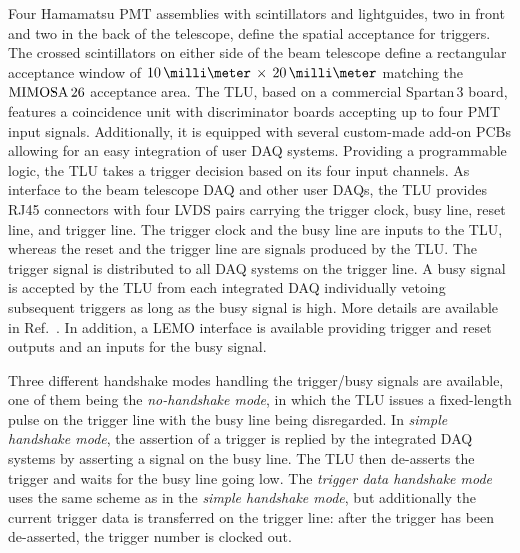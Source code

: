Four Hamamatsu PMT assemblies with scintillators and lightguides, two in front and two in the back of the telescope, define the spatial acceptance for triggers. 
The crossed scintillators on either side of the beam telescope define a rectangular acceptance window of $10\,\milli\meter\,\times\,20\,\milli\meter$ matching the $\textrm{MIMOSA\,26}$ acceptance area. 
The TLU, based on a commercial Spartan\,3 board, features a coincidence unit with discriminator boards accepting up to four PMT input signals. 
Additionally, it is equipped with several custom-made add-on PCBs allowing for an easy integration of user DAQ systems. 
Providing a programmable logic, the TLU  takes a trigger decision based on its four input channels. 
As interface to the beam telescope DAQ and other user DAQs, the TLU provides RJ45 connectors with four LVDS pairs carrying the trigger clock, busy line, reset line, and trigger line. 
The trigger clock and the busy line are inputs to the TLU, whereas the reset and the trigger line are signals produced by the TLU. 
The trigger signal is distributed to all DAQ systems on the trigger line. 
A busy signal is accepted by the TLU from each integrated DAQ individually vetoing subsequent triggers as long as the busy signal is high. 
More details are available in Ref.~\cite{EUDET-2009-04,ref:TLUproc}.
In addition, a LEMO interface is available providing trigger and reset outputs and an inputs for the busy signal.

Three different handshake modes handling the trigger/busy signals are available, one of them being the \textit{no-handshake mode},
 in which the TLU issues a fixed-length pulse on the trigger line with the busy line being disregarded. 
In \textit{simple handshake mode}, the assertion of a trigger is replied by the integrated DAQ systems by asserting a signal on the busy line. 
The TLU then de-asserts the trigger and waits for the busy line going low.
The \textit{trigger data handshake mode} uses the same scheme as in the \textit{simple handshake mode}, but additionally the current trigger data is transferred on the trigger line:
after the trigger has been de-asserted, the trigger number is clocked out. 
%

